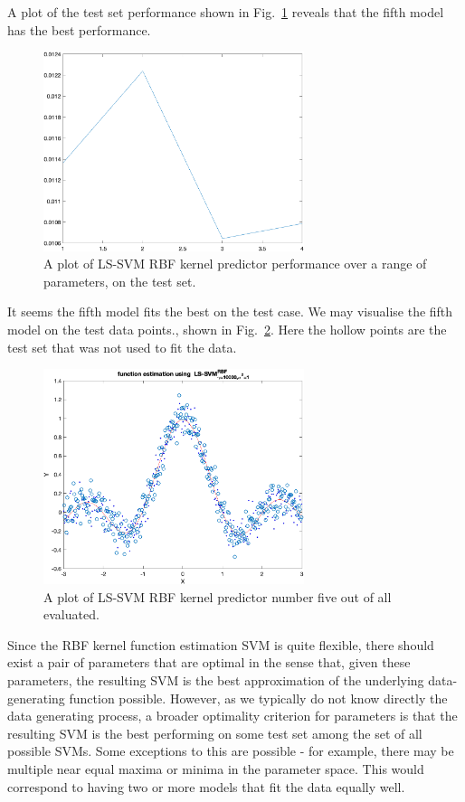 \documentclass[10pt,a4paper]{article}
\begin{document}
A plot of the test set performance shown in Fig.~\ref{fig:RBFtestsetPerf} reveals that the fifth model has the best performance.

\begin{figure}[h!]
\centering
  \includegraphics[width=3in]{RBFtestsetPerf.png}
  \caption{A plot of LS-SVM RBF kernel predictor performance over a range of parameters, on the test set.}
  \label{fig:RBFtestsetPerf}
\end{figure}

It seems the fifth model fits the best on the test case. We may visualise the fifth model on the test data points., shown in Fig.~\ref{fig:fifthModelPlot}. Here the hollow points are the test set that was not used to fit the data.

\begin{figure}[h!]
\centering
  \includegraphics[width=3in]{fifthModelPlot.png}
  \caption{A plot of LS-SVM RBF kernel predictor number five out of all evaluated.}
  \label{fig:fifthModelPlot}
\end{figure}

Since the RBF kernel function estimation SVM is quite flexible, there should exist a pair of parameters that are optimal in the sense that, given these parameters, the resulting SVM is the best approximation of the underlying data-generating function possible. However, as we typically do not know directly the data generating process, a broader optimality criterion for parameters is that the resulting SVM is the best performing on some test set among the set of all possible SVMs. Some exceptions to this are possible - for example, there may be multiple near equal maxima or minima in the parameter space. This would correspond to having two or more models that fit the data equally well.
\end{document}
